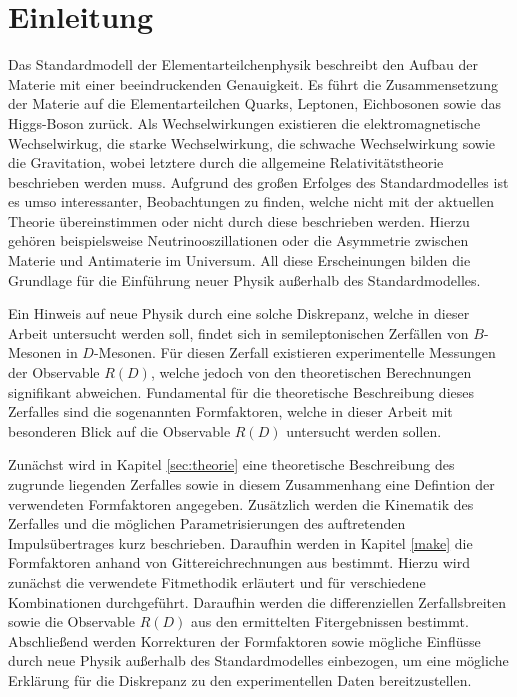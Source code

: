 \chapter{Einleitung}

Das Standardmodell der Elementarteilchenphysik beschreibt den Aufbau der Materie mit einer beeindruckenden Genauigkeit.
Es führt die Zusammensetzung der Materie auf die Elementarteilchen Quarks, Leptonen, Eichbosonen sowie das Higgs-Boson zurück.
Als Wechselwirkungen existieren die elektromagnetische Wechselwirkug, die starke Wechselwirkung, die schwache Wechselwirkung sowie die Gravitation, wobei letztere durch die allgemeine Relativitätstheorie beschrieben werden muss.
Aufgrund des großen Erfolges des Standardmodelles ist es umso interessanter, Beobachtungen zu finden, welche nicht mit der aktuellen Theorie übereinstimmen oder nicht durch diese beschrieben werden.
Hierzu gehören beispielsweise Neutrinooszillationen oder die Asymmetrie zwischen Materie und Antimaterie im Universum.
All diese Erscheinungen bilden die Grundlage für die Einführung neuer Physik außerhalb des Standardmodelles.

Ein Hinweis auf neue Physik durch eine solche Diskrepanz, welche in dieser Arbeit untersucht werden soll, findet sich in semileptonischen Zerfällen von $B$-Mesonen in $D$-Mesonen.
Für diesen Zerfall existieren experimentelle Messungen der Observable $R(D)$, welche jedoch von den theoretischen Berechnungen signifikant abweichen.
Fundamental für die theoretische Beschreibung dieses Zerfalles sind die sogenannten Formfaktoren, welche in dieser Arbeit mit besonderen Blick auf die Observable $R(D)$ untersucht werden sollen.

Zunächst wird in Kapitel \ref{sec:theorie} eine theoretische Beschreibung des zugrunde liegenden Zerfalles sowie in diesem Zusammenhang eine Defintion der verwendeten Formfaktoren angegeben.
Zusätzlich werden die Kinematik des Zerfalles und die möglichen Parametrisierungen des auftretenden Impulsübertrages kurz beschrieben.
Daraufhin werden in Kapitel \ref{make} die Formfaktoren anhand von Gittereichrechnungen aus \cite{PhysRevD.92.034506} bestimmt.
Hierzu wird zunächst die verwendete Fitmethodik erläutert und für verschiedene Kombinationen durchgeführt.
Daraufhin werden die differenziellen Zerfallsbreiten sowie die Observable $R(D)$ aus den ermittelten Fitergebnissen bestimmt.
Abschließend werden Korrekturen der Formfaktoren sowie mögliche Einflüsse durch neue Physik außerhalb des Standardmodelles einbezogen, um eine mögliche Erklärung für die Diskrepanz zu den experimentellen Daten bereitzustellen.
